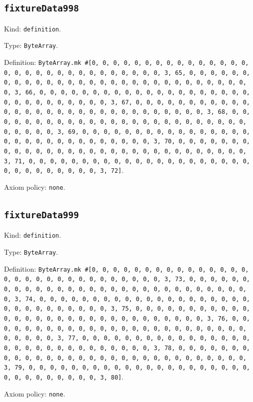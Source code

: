 \documentclass[11pt]{article}
\begin{document}
\subsection*{\texttt{fixtureData998}}
\noindent Kind: \texttt{definition}.\par
\noindent Type: \texttt{ByteArray}.\par
\noindent Definition: \texttt{ByteArray.mk \#[0, 0, 0, 0, 0, 0, 0, 0, 0, 0, 0, 0, 0, 0, 0, 0, 0, 0, 0, 0, 0, 0, 0, 0, 0, 0, 0, 0, 0, 0, 3, 65, 0, 0, 0, 0, 0, 0, 0, 0, 0, 0, 0, 0, 0, 0, 0, 0, 0, 0, 0, 0, 0, 0, 0, 0, 0, 0, 0, 0, 0, 0, 3, 66, 0, 0, 0, 0, 0, 0, 0, 0, 0, 0, 0, 0, 0, 0, 0, 0, 0, 0, 0, 0, 0, 0, 0, 0, 0, 0, 0, 0, 0, 0, 3, 67, 0, 0, 0, 0, 0, 0, 0, 0, 0, 0, 0, 0, 0, 0, 0, 0, 0, 0, 0, 0, 0, 0, 0, 0, 0, 0, 0, 0, 0, 0, 3, 68, 0, 0, 0, 0, 0, 0, 0, 0, 0, 0, 0, 0, 0, 0, 0, 0, 0, 0, 0, 0, 0, 0, 0, 0, 0, 0, 0, 0, 0, 0, 3, 69, 0, 0, 0, 0, 0, 0, 0, 0, 0, 0, 0, 0, 0, 0, 0, 0, 0, 0, 0, 0, 0, 0, 0, 0, 0, 0, 0, 0, 0, 0, 3, 70, 0, 0, 0, 0, 0, 0, 0, 0, 0, 0, 0, 0, 0, 0, 0, 0, 0, 0, 0, 0, 0, 0, 0, 0, 0, 0, 0, 0, 0, 0, 3, 71, 0, 0, 0, 0, 0, 0, 0, 0, 0, 0, 0, 0, 0, 0, 0, 0, 0, 0, 0, 0, 0, 0, 0, 0, 0, 0, 0, 0, 0, 0, 3, 72]}.\par
\noindent Axiom policy: \texttt{none}.\par
\subsection*{\texttt{fixtureData999}}
\noindent Kind: \texttt{definition}.\par
\noindent Type: \texttt{ByteArray}.\par
\noindent Definition: \texttt{ByteArray.mk \#[0, 0, 0, 0, 0, 0, 0, 0, 0, 0, 0, 0, 0, 0, 0, 0, 0, 0, 0, 0, 0, 0, 0, 0, 0, 0, 0, 0, 0, 0, 3, 73, 0, 0, 0, 0, 0, 0, 0, 0, 0, 0, 0, 0, 0, 0, 0, 0, 0, 0, 0, 0, 0, 0, 0, 0, 0, 0, 0, 0, 0, 0, 3, 74, 0, 0, 0, 0, 0, 0, 0, 0, 0, 0, 0, 0, 0, 0, 0, 0, 0, 0, 0, 0, 0, 0, 0, 0, 0, 0, 0, 0, 0, 0, 3, 75, 0, 0, 0, 0, 0, 0, 0, 0, 0, 0, 0, 0, 0, 0, 0, 0, 0, 0, 0, 0, 0, 0, 0, 0, 0, 0, 0, 0, 0, 0, 3, 76, 0, 0, 0, 0, 0, 0, 0, 0, 0, 0, 0, 0, 0, 0, 0, 0, 0, 0, 0, 0, 0, 0, 0, 0, 0, 0, 0, 0, 0, 0, 3, 77, 0, 0, 0, 0, 0, 0, 0, 0, 0, 0, 0, 0, 0, 0, 0, 0, 0, 0, 0, 0, 0, 0, 0, 0, 0, 0, 0, 0, 0, 0, 3, 78, 0, 0, 0, 0, 0, 0, 0, 0, 0, 0, 0, 0, 0, 0, 0, 0, 0, 0, 0, 0, 0, 0, 0, 0, 0, 0, 0, 0, 0, 0, 3, 79, 0, 0, 0, 0, 0, 0, 0, 0, 0, 0, 0, 0, 0, 0, 0, 0, 0, 0, 0, 0, 0, 0, 0, 0, 0, 0, 0, 0, 0, 0, 3, 80]}.\par
\noindent Axiom policy: \texttt{none}.\par
\end{document}
